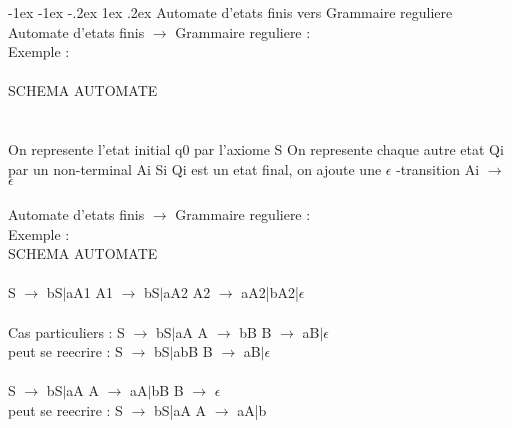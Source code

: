 \documentclass[5pt]{article}
\makeatletter
\renewcommand{\subsubsection}{\@startsection {section}{1}{\z@}%
             {-1ex \@plus -1ex \@minus -.2ex}%
             {1ex \@plus.2ex}%
             {\normalfont\scriptsize\sffamily\bfseries}}
\makeatother
\begin{document}
\begin{scriptsize}
\subsubsection{Automate d'etats finis vers Grammaire reguliere}
Automate d’etats finis $\rightarrow$ Grammaire reguliere :\\
Exemple :\\
\\
SCHEMA AUTOMATE\\
\\
\\
On represente l’etat initial q0 par l’axiome S On represente chaque autre etat Qi par un non-terminal Ai Si Qi est un etat final, on ajoute une $\epsilon$ -transition Ai $\rightarrow$ $\epsilon$\\
\\
Automate d’etats finis $\rightarrow$ Grammaire reguliere :\\
Exemple :
\\
SCHEMA AUTOMATE\\
\\
S $\rightarrow$ bS$\mid$aA1 A1 $\rightarrow$ bS$\mid$aA2 A2 $\rightarrow$ aA2|bA2|$\epsilon$\\
\\
Cas particuliers : S $\rightarrow$ bS$\mid$aA A $\rightarrow$ bB B $\rightarrow$ aB$\mid\epsilon$\\
peut se reecrire : S $\rightarrow$ bS$\mid$abB B $\rightarrow$ aB$\mid\epsilon$\\
\\
S $\rightarrow$ bS$\mid$aA A $\rightarrow$ aA$\mid$bB B $\rightarrow$ $\epsilon$\\
peut se reecrire : S $\rightarrow$ bS|aA A $\rightarrow$ aA|b

\end{scriptsize}
\end{document}
